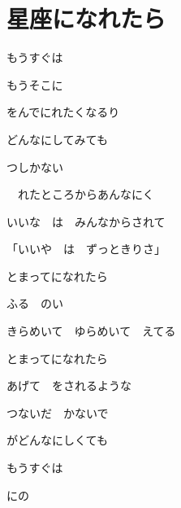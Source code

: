 \section{星座になれたら}

もうすぐは 

もうそこに

をんでにれたくなるり

どんなにしてみても

つしかない

　れたところからあんなにく

\bigskip

いいな　は　みんなからされて

「いいや　は　ずっときりさ」

\bigskip

とまってになれたら

ふる　のい

きらめいて　ゆらめいて　えてる

とまってになれたら

あげて　をされるような

つないだ　かないで

がどんなにしくても

\bigskip

もうすぐは 

にの


